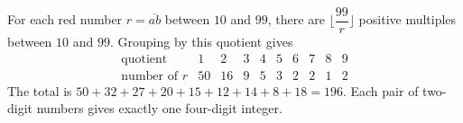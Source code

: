 For each red number $r=\overline{ab}$ between $10$ and $99$, there are $\lfloor\dfrac{99}{r}\rfloor$ positive multiples between $10$ and $99$. Grouping by this quotient gives
\[\begin{array}{c|rrrrrrrrr}\text{quotient}&1&2&3&4&5&6&7&8&9\\\text{number of }r&50&16&9&5&3&2&2&1&2\end{array}\]
The total is $50+32+27+20+15+12+14+8+18=\boxed{196}$. Each pair of two-digit numbers gives exactly one four-digit integer.
